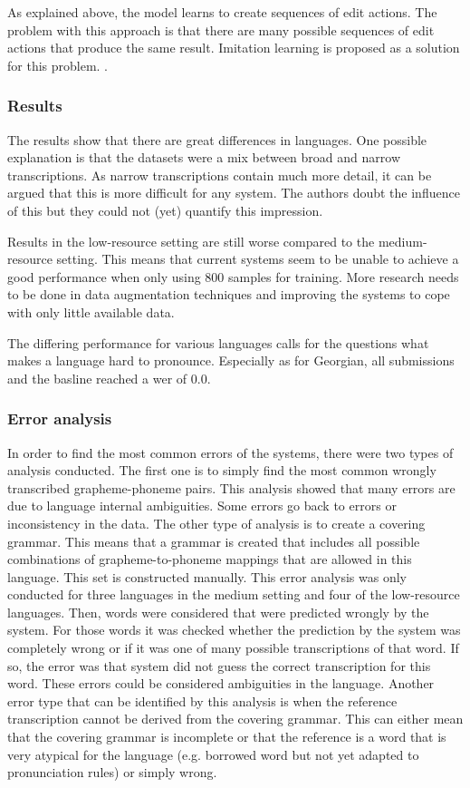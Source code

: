 As explained above, the model learns to create sequences of edit actions. The problem with this approach is that there are many possible sequences of edit actions that produce the same result. Imitation learning is proposed as a solution for this problem. . 

\subsubsection*{Results}
The results show that there are great differences in languages. One possible explanation is that the datasets were a mix between broad and narrow transcriptions. As narrow transcriptions contain much more detail, it can be argued that this is more difficult for any system. The authors doubt the influence of this but they could not (yet) quantify this impression. 

Results in the low-resource setting are still worse compared to the medium-resource setting. This means that current systems seem to be unable to achieve a good performance when only using 800 samples for training. More research needs to be done in data augmentation techniques and improving the systems to cope with only little available data.

The differing performance for various languages calls for the questions what makes a language hard to pronounce. Especially as for Georgian, all submissions and the basline reached a \ac{wer} of $0.0$.

  
\subsubsection*{Error analysis}
In order to find the most common errors of the systems, there were two types of analysis conducted. The first one is to simply find the most common wrongly transcribed grapheme-phoneme pairs. This analysis showed that many errors are due to language internal ambiguities. Some errors go back to errors or inconsistency in the data. 
The other type of analysis is to create a covering grammar. This means that a grammar is created that includes all possible combinations of grapheme-to-phoneme mappings that are allowed in this language. This set is constructed manually. This error analysis was only conducted for three languages in the medium setting and four of the low-resource languages. Then, words were considered that were predicted wrongly by the system. For those words it was checked whether the prediction by the system was completely wrong or if it was one of many possible transcriptions of that word. If so, the error was that system did not guess the correct transcription for this word. These errors could be considered ambiguities in the language. Another error type that can be identified by this analysis is when the reference transcription cannot be derived from the covering grammar. This can either mean that the covering grammar is incomplete or that the reference is a word that is very atypical for the language (e.g. borrowed word but not yet adapted to pronunciation rules) or simply wrong. 

